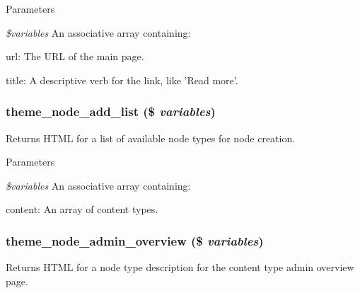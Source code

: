 \begin{DoxyParams}{Parameters}
\item[{\em \$variables}]An associative array containing:
\begin{DoxyItemize}
\item url: The URL of the main page.
\item title: A descriptive verb for the link, like 'Read more'. 
\end{DoxyItemize}\end{DoxyParams}
\hypertarget{group__themeable_gab493e4a21e1f9653a52edf932492f6f6}{
\subsubsection[{theme\_\-node\_\-add\_\-list}]{\setlength{\rightskip}{0pt plus 5cm}theme\_\-node\_\-add\_\-list (\$ {\em variables})}}
\label{group__themeable_gab493e4a21e1f9653a52edf932492f6f6}
Returns HTML for a list of available node types for node creation.


\begin{DoxyParams}{Parameters}
\item[{\em \$variables}]An associative array containing:
\begin{DoxyItemize}
\item content: An array of content types. 
\end{DoxyItemize}\end{DoxyParams}
\hypertarget{group__themeable_ga5e362c601057afe19e454d31b708a19e}{
\subsubsection[{theme\_\-node\_\-admin\_\-overview}]{\setlength{\rightskip}{0pt plus 5cm}theme\_\-node\_\-admin\_\-overview (\$ {\em variables})}}
\label{group__themeable_ga5e362c601057afe19e454d31b708a19e}
Returns HTML for a node type description for the content type admin overview page.



